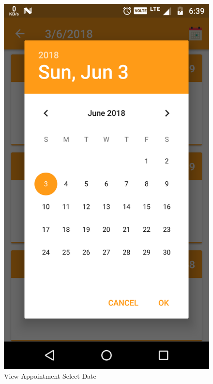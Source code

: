 \\
\begin{figure}[h]
	\centering
	\includegraphics[width=0.7\linewidth]{ViewAppointmentSelectDate}
	\caption{View Appointment Select Date}
\end{figure}
\pagebreak

